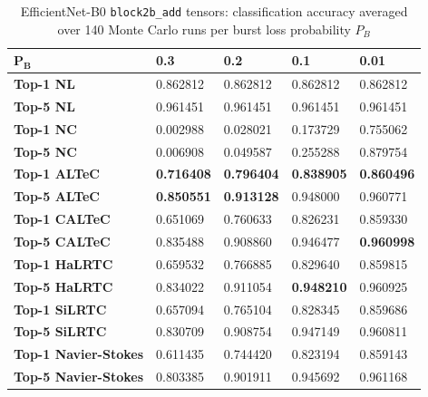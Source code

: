 \documentclass[conference,letterpaper]{IEEEtran}
\begin{document}
\begin{table}[t]
\caption{EfficientNet-B0 \texttt{block2b\_add} tensors: classification accuracy averaged over 140 Monte Carlo runs per burst loss probability $P_B$}
\label{table:efficientnetb0}
\begin{tabular}{|l|llll|}
\hline
$\mathbf{P_B}$    & \textbf{0.3} & \textbf{0.2}    & \textbf{0.1}   & \textbf{0.01}              \\
\hline
\textbf{Top-1 NL}         & 0.862812 & 0.862812 & 0.862812 & 0.862812           \\
\textbf{Top-5 NL}         & 0.961451 & 0.961451 & 0.961451 & 0.961451           \\
\hline
\textbf{Top-1 NC}         & 0.002988 & 0.028021 & 0.173729 & 0.755062           \\
\textbf{Top-5 NC}         & 0.006908 & 0.049587 & 0.255288 & 0.879754           \\
\hline
\textbf{Top-1 ALTeC}  & \textbf{0.716408} & \textbf{0.796404} & \textbf{0.838905} & \textbf{0.860496}           \\
\textbf{Top-5 ALTeC}  & \textbf{0.850551} & \textbf{0.913128} & 0.948000 & 0.960771           \\
\hline
\textbf{Top-1 CALTeC}   & 0.651069 & 0.760633 & 0.826231 & 0.859330           \\
\textbf{Top-5 CALTeC}   & 0.835488 & 0.908860 & 0.946477 & \textbf{0.960998}           \\
\hline
\textbf{Top-1 HaLRTC}  & 0.659532 & 0.766885 & 0.829640 & 0.859815           \\
\textbf{Top-5 HaLRTC}  & 0.834022 & 0.911054 & \textbf{0.948210} & 0.960925           \\
\hline
\textbf{Top-1 SiLRTC}  & 0.657094 & 0.765104 & 0.828345 & 0.859686           \\
\textbf{Top-5 SiLRTC}  & 0.830709 & 0.908754 & 0.947149 & 0.960811           \\
\hline
\textbf{Top-1 Navier-Stokes} & 0.611435 & 0.744420 & 0.823194 & 0.859143           \\
\textbf{Top-5 Navier-Stokes} & 0.803385 & 0.901911 & 0.945692 & 0.961168           \\
\hline
\end{tabular}
\end{table}
\end{document}

